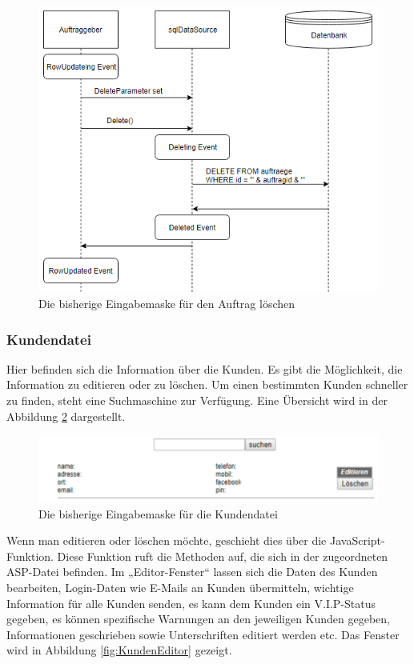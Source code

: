 \begin{figure}[h]
	\centering
	\includegraphics[width=0.6\linewidth]{Graphics/auftragLoeschen.png}
	\caption[AutragLoeschen]{Die bisherige Eingabemaske für den Auftrag löschen}
	\label{fig:Autrag_Loeschen}
\end{figure}

\pagebreak
\subsubsection{Kundendatei}

Hier befinden sich die Information über die Kunden. Es gibt die Möglichkeit, die Information zu editieren oder zu löschen. Um einen bestimmten Kunden schneller zu finden, steht eine Suchmaschine zur Verfügung. Eine Übersicht wird in der Abbildung \ref{fig:KundenDatei} dargestellt.

\begin{figure}[h]
	\centering
	\includegraphics[width=0.7\linewidth]{Graphics/kundenDatei.png}
	\caption[Kundeansicht]{Die bisherige Eingabemaske für die Kundendatei}
	\label{fig:KundenDatei}
\end{figure}

Wenn man editieren oder löschen möchte, geschieht dies über die JavaScript-Funktion. Diese Funktion ruft die Methoden auf, die sich in der zugeordneten ASP-Datei befinden. Im „Editor-Fenster“ lassen sich die Daten des Kunden bearbeiten, Login-Daten wie E-Mails an Kunden übermitteln, wichtige Information für alle Kunden senden, es kann dem Kunden ein V.I.P-Status gegeben, es können spezifische Warnungen an den jeweiligen Kunden gegeben, Informationen geschrieben sowie Unterschriften editiert werden etc. Das Fenster wird in Abbildung \ref{fig:KundenEditor} gezeigt.

